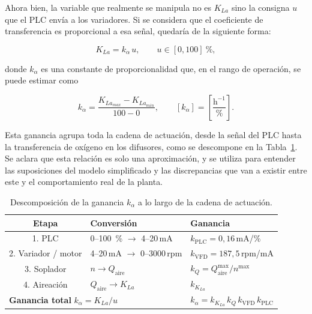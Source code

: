 Ahora bien, la variable que realmente se manipula no es $K_{La}$ sino la
consigna $u$ que el PLC envía a los variadores. Si se considera que el
coeficiente de transferencia es proporcional a esa señal, quedaría de la
siguiente forma:

\begin{equation}
K_{La} = k_\alpha\, u , \qquad u \in [0,100]~\%,
\end{equation}

donde $k_\alpha$ es una constante de proporcionalidad que, en el rango de
operación, se puede estimar como

\begin{equation}
k_\alpha = \frac{K_{La_{max}}-K_{La_{min}}}{100-0},
\qquad
\left[k_\alpha\right] = \left[\frac{\mathrm{h}^{-1}}{\%}\right].
\end{equation}

Esta ganancia agrupa toda la cadena de actuación, desde la señal del PLC hasta
la transferencia de oxígeno en los difusores, como se descompone en la
Tabla~\ref{tab:gain_decomposition}. Se aclara que esta relación es solo una
aproximación, y se utiliza para entender las suposiciones del modelo
simplificado y las discrepancias que van a existir entre este y el
comportamiento real de la planta.

\begin{table}[!htbp]
\centering
\caption{Descomposición de la ganancia $k_\alpha$ a lo largo de la cadena de
actuación.}
\label{tab:gain_decomposition}
\begin{tabular}{cll}
\toprule
\textbf{Etapa} & \textbf{Conversión} & \textbf{Ganancia} \\
\midrule
1. PLC          & 0--100~\% $\to$ 4--20\,mA          & $k_{\mathrm{PLC}} = 0{,}16$\,mA/\% \\
2. Variador / motor  & 4--20\,mA $\to$ 0--3000\,rpm  & $k_{\mathrm{VFD}} = 187{,}5$\,rpm/mA \\
3. Soplador     & $n \to Q_{\mathrm{aire}}$            & $k_Q = Q_{\mathrm{aire}}^{\max}/n^{\max}$ \\
4. Aireación    & $Q_{\mathrm{aire}} \to K_{La}$      & $k_{K_{La}}$ \\
\midrule[\heavyrulewidth]
\multicolumn{2}{l}{\textbf{Ganancia total} $k_\alpha = K_{La}/u$}
                & $k_\alpha = k_{K_{La}}\, k_Q\, k_{\mathrm{VFD}}\, k_{\mathrm{PLC}}$ \\
\bottomrule
\end{tabular}
\end{table}

